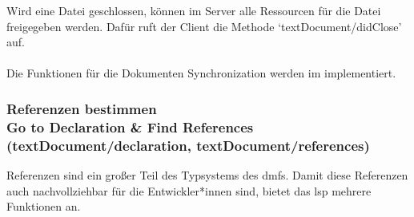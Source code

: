 \documentclass[./einleitung.tex]{subfiles}
\begin{document}
    Wird eine Datei geschlossen, können im Server alle Ressourcen für die Datei freigegeben werden.
    Dafür ruft der Client die Methode `textDocument/didClose' auf.
    \\\\
    Die Funktionen für die Dokumenten Synchronization werden im  implementiert.

    \subsubsection[Referenzen bestimmen]{Referenzen bestimmen\\ {\textnormal{\footnotesize Go to Declaration \& Find References \\ (textDocument/declaration, textDocument/references) \cite{declaration} \cite{references}}}}\label{subsubsec:referenzen}
    Referenzen sind ein großer Teil des Typsystems des \acrshort{dmf}s.
    Damit diese Referenzen auch nachvollziehbar für die Entwickler*innen sind, bietet das \acrshort{lsp} mehrere Funktionen an.
\end{document}
